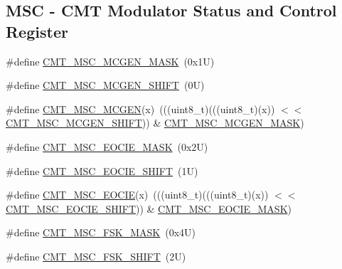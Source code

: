 \subsection*{M\+SC -\/ C\+MT Modulator Status and Control Register}
\begin{DoxyCompactItemize}
\item 
\#define \mbox{\hyperlink{group___c_m_t___register___masks_ga009968608dc16f63225cbfa192f0e159}{C\+M\+T\+\_\+\+M\+S\+C\+\_\+\+M\+C\+G\+E\+N\+\_\+\+M\+A\+SK}}~(0x1\+U)
\item 
\#define \mbox{\hyperlink{group___c_m_t___register___masks_ga1245001d81145a1cede60ee0d98b9522}{C\+M\+T\+\_\+\+M\+S\+C\+\_\+\+M\+C\+G\+E\+N\+\_\+\+S\+H\+I\+FT}}~(0\+U)
\item 
\#define \mbox{\hyperlink{group___c_m_t___register___masks_ga8d4953240cb948382a8e53e369c84d4f}{C\+M\+T\+\_\+\+M\+S\+C\+\_\+\+M\+C\+G\+EN}}(x)~(((uint8\+\_\+t)(((uint8\+\_\+t)(x)) $<$$<$ \mbox{\hyperlink{group___c_m_t___register___masks_ga1245001d81145a1cede60ee0d98b9522}{C\+M\+T\+\_\+\+M\+S\+C\+\_\+\+M\+C\+G\+E\+N\+\_\+\+S\+H\+I\+FT}})) \& \mbox{\hyperlink{group___c_m_t___register___masks_ga009968608dc16f63225cbfa192f0e159}{C\+M\+T\+\_\+\+M\+S\+C\+\_\+\+M\+C\+G\+E\+N\+\_\+\+M\+A\+SK}})
\item 
\#define \mbox{\hyperlink{group___c_m_t___register___masks_gab7f246dc8aa0260f2696a23de0482cef}{C\+M\+T\+\_\+\+M\+S\+C\+\_\+\+E\+O\+C\+I\+E\+\_\+\+M\+A\+SK}}~(0x2\+U)
\item 
\#define \mbox{\hyperlink{group___c_m_t___register___masks_gaa7fa1a5e01690a63a09459cca5b763d0}{C\+M\+T\+\_\+\+M\+S\+C\+\_\+\+E\+O\+C\+I\+E\+\_\+\+S\+H\+I\+FT}}~(1\+U)
\item 
\#define \mbox{\hyperlink{group___c_m_t___register___masks_ga35f1149c8a910b7c02e4429e37fff009}{C\+M\+T\+\_\+\+M\+S\+C\+\_\+\+E\+O\+C\+IE}}(x)~(((uint8\+\_\+t)(((uint8\+\_\+t)(x)) $<$$<$ \mbox{\hyperlink{group___c_m_t___register___masks_gaa7fa1a5e01690a63a09459cca5b763d0}{C\+M\+T\+\_\+\+M\+S\+C\+\_\+\+E\+O\+C\+I\+E\+\_\+\+S\+H\+I\+FT}})) \& \mbox{\hyperlink{group___c_m_t___register___masks_gab7f246dc8aa0260f2696a23de0482cef}{C\+M\+T\+\_\+\+M\+S\+C\+\_\+\+E\+O\+C\+I\+E\+\_\+\+M\+A\+SK}})
\item 
\#define \mbox{\hyperlink{group___c_m_t___register___masks_gae434ad9168835c6d9e4d941a90a568cb}{C\+M\+T\+\_\+\+M\+S\+C\+\_\+\+F\+S\+K\+\_\+\+M\+A\+SK}}~(0x4\+U)
\item 
\#define \mbox{\hyperlink{group___c_m_t___register___masks_ga73422722bbae07a50d0b2b473f5f9417}{C\+M\+T\+\_\+\+M\+S\+C\+\_\+\+F\+S\+K\+\_\+\+S\+H\+I\+FT}}~(2\+U)

\end{DoxyCompactItemize}
